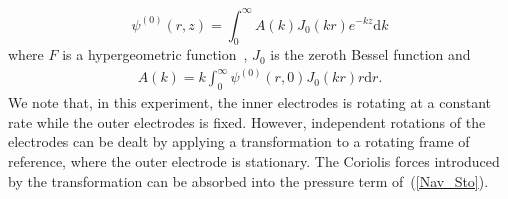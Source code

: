 \begin{equation}
\label{base_psi}
\psi^{(0)}(r,z) = \int_0^\infty A(k)J_0(kr)e^{-kz} \text{d}k
\end{equation}
where $F$ is a hypergeometric function~\cite{EDCTAFUCF}, $J_0$ is the zeroth Bessel function and
\begin{align}
A(k) = k\int_0^\infty \psi^{(0)}(r,0)J_0(kr)r\text{d}r.
\end{align}
We note that, in this experiment, the inner electrodes is rotating at a constant rate while the outer electrodes is fixed.  However, independent rotations of the electrodes can be dealt by applying a transformation to a rotating frame of reference, where the outer electrode is stationary. The Coriolis forces introduced by the transformation can be absorbed into the pressure term of~(\ref{Nav_Sto}).

